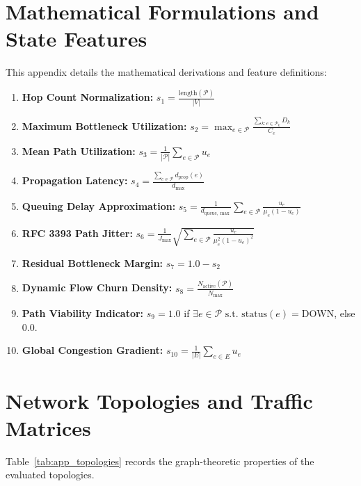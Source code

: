 \documentclass[12pt,a4paper,oneside]{report}
\begin{document}
\chapter{Mathematical Formulations and State Features}
\label{app:formulations}
This appendix details the mathematical derivations and feature definitions:
\begin{enumerate}
  \item \textbf{Hop Count Normalization:} $s_1 = \frac{\mathrm{length}(\mathcal{P})}{|V|}$
  \item \textbf{Maximum Bottleneck Utilization:} $s_2 = \max_{e \in \mathcal{P}} \frac{\sum_{k: e \in \mathcal{P}_k} D_k}{C_e}$
  \item \textbf{Mean Path Utilization:} $s_3 = \frac{1}{|\mathcal{P}|} \sum_{e \in \mathcal{P}} u_e$
  \item \textbf{Propagation Latency:} $s_4 = \frac{\sum_{e \in \mathcal{P}} d_{\mathrm{prop}}(e)}{d_{\max}}$
  \item \textbf{Queuing Delay Approximation:} $s_5 = \frac{1}{d_{\mathrm{queue,\max}}} \sum_{e \in \mathcal{P}} \frac{u_e}{\mu_e(1 - u_e)}$
  \item \textbf{RFC 3393 Path Jitter:} $s_6 = \frac{1}{J_{\max}} \sqrt{\sum_{e \in \mathcal{P}} \frac{u_e}{\mu_e^2 (1 - u_e)^2}}$
  \item \textbf{Residual Bottleneck Margin:} $s_7 = 1.0 - s_2$
  \item \textbf{Dynamic Flow Churn Density:} $s_8 = \frac{N_{\mathrm{active}}(\mathcal{P})}{N_{\mathrm{max}}}$
  \item \textbf{Path Viability Indicator:} $s_9 = 1.0$ if $\exists e \in \mathcal{P} \text{ s.t. } \mathrm{status}(e) = \mathrm{DOWN}$, else $0.0$.
  \item \textbf{Global Congestion Gradient:} $s_{10} = \frac{1}{|E|} \sum_{e \in E} u_e$
\end{enumerate}

\chapter{Network Topologies and Traffic Matrices}
\label{app:topologies}
Table~\ref{tab:app_topologies} records the graph-theoretic properties of the evaluated topologies.
\end{document}
